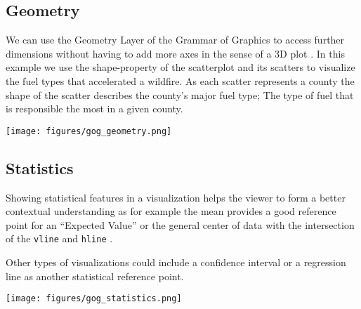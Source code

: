 \vspace{-2mm}

\subsection*{Geometry}
\vspace{-2mm}
\begin{minipage}[t]{0.6\textwidth}
    We can use the Geometry Layer of the Grammar of Graphics to access further dimensions without having to
    add more axes in the sense of a 3D plot \cite{wilkinsonGeometry2005}. In this example we use the shape-property of the scatterplot and
    its scatters to visualize the fuel types that accelerated a wildfire. As each scatter represents a county
    the shape of the scatter describes the county's major fuel type; The type of fuel that is responsible the most
    in a given county.
    \hspace{1cm}
\end{minipage}%
\begin{minipage}[t]{0.4\textwidth}
    \vspace{-20pt}
    \texttt{[image: figures/gog\_geometry.png]}
\end{minipage}

\vspace{-2mm}

\subsection*{Statistics}
\vspace{-2mm}
\begin{minipage}[t]{0.6\textwidth}
    Showing statistical features in a visualization helps the viewer to form a better
    contextual understanding as for example the mean provides a good reference point for
    an ``Expected Value'' or the general center of data with the intersection of the \texttt{vline} and \texttt{hline} \cite{wilkinsonStatistics2005}.
    
    Other types of visualizations could include a confidence interval or a regression line as another statistical reference point.
    \hspace{1cm}
\end{minipage}%
\begin{minipage}[t]{0.4\textwidth}
    \vspace{-20pt}
    \texttt{[image: figures/gog\_statistics.png]}
\end{minipage}

